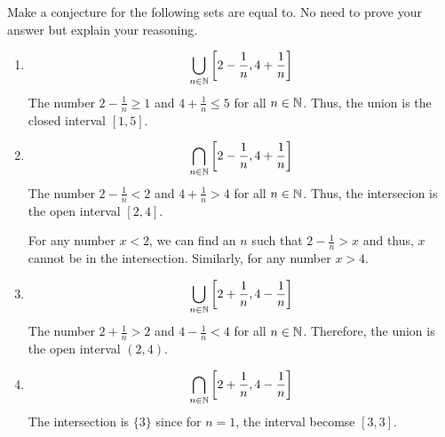 \bp
Make a conjecture for the following sets are equal to. No need to prove your answer but explain your reasoning.
\begin{enumerate}

	\item 
		$$\bigcup_{n \in \mathbb{N}} \left[ 2 - \frac{1}{n}, 4 + \frac{1}{n} \right]$$
		\bs
		The number $2 - \frac{1}{n} \geq 1$ and $4 + \frac{1}{n} \leq 5$ for all $n \in \mathbb{N}$. Thus, the union is the closed interval $[1, 5]$.
		\es


	\item 
		$$\bigcap_{n \in \mathbb{N}} \left[ 2 - \frac{1}{n}, 4 + \frac{1}{n} \right]$$
		\bs
		The number $2 - \frac{1}{n} < 2$ and $4 + \frac{1}{n} > 4$ for all $n \in \mathbb{N}$. Thus, the intersecion is the open interval $[2, 4]$. 

		For any number $x < 2$, we can find an $n$ such that $2 - \frac{1}{n} > x$ and thus, $x$ cannot be in the intersection. Similarly, for any number $x > 4$.
		\es

	\item $$\bigcup_{n \in \mathbb{N}} \left[ 2 + \frac{1}{n}, 4 - \frac{1}{n} \right]$$
		\bs
		The number $2 + \frac{1}{n} > 2$ and $4 - \frac{1}{n} < 4$ for all $n \in \mathbb{N}$. Therefore, the union is the open interval $(2, 4)$.
		\es


	\item $$\bigcap_{n \in \mathbb{N}} \left[ 2 + \frac{1}{n}, 4 - \frac{1}{n} \right]$$
		\bs The intersection is $\{3\}$ since for $n = 1$, the interval becomse $[3,3]$. \es

\end{enumerate}
\ep
